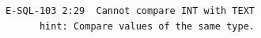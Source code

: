 \begin{lstlisting}[]
E-SQL-103 2:29  Cannot compare INT with TEXT
      hint: Compare values of the same type.
\end{lstlisting}

